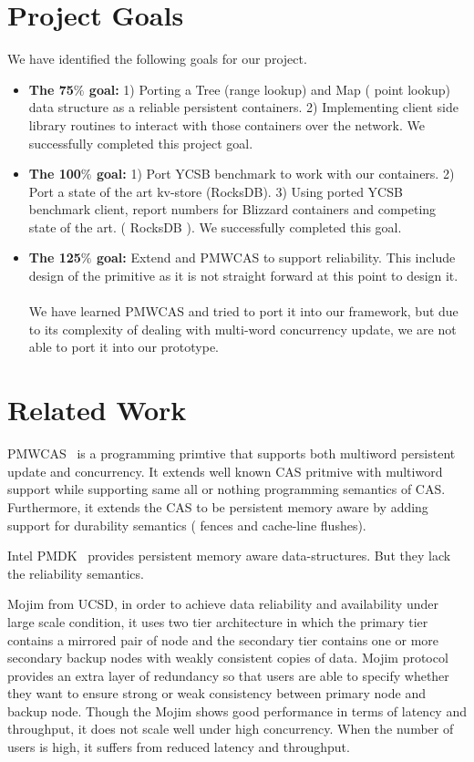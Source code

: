 \section{Project Goals}
We have identified the following goals for our project.
\begin{itemize}
    \item {\bf The 75$\%$ goal:} 1) Porting a Tree (range lookup) and Map ( point lookup) data structure as a reliable persistent containers. 2) Implementing client side library routines to interact with those containers over the network. We successfully completed
				this project goal.
    \item {\bf The 100$\%$ goal:} 1) Port YCSB benchmark to work with our containers. 
				2) Port a state of the art kv-store (RocksDB). 3) Using ported YCSB benchmark client, report numbers 
				for Blizzard containers and competing state of the art. ( RocksDB ). We successfully completed this goal.
    \\
    \item {\bf The 125$\%$ goal:} Extend and PMWCAS to support reliability. This include design of the primitive as it is not straight forward at this point to design it.
    \\ \\
    We have learned PMWCAS and tried to port it into our framework, but due to its complexity of dealing with multi-word concurrency update, we are not able to port it into our prototype. 
\end{itemize}

\section{Related Work}

PMWCAS~\cite{pmwcas} is a programming primtive that supports both multiword persistent update and concurrency.
It extends well known CAS pritmive with multiword support while supporting same all or nothing
programming semantics of CAS. Furthermore, it extends the CAS to be persistent memory aware by
adding support for durability semantics ( fences and cache-line flushes).

Intel PMDK~\cite{pmdk} provides persistent memory aware data-structures. But they lack the reliability semantics.

Mojim from UCSD, in order to achieve data reliability and availability under large scale condition, it uses two tier architecture in which the primary tier contains a mirrored pair of node and the secondary tier contains one or more secondary backup nodes with weakly consistent copies of data. Mojim protocol provides an extra layer of redundancy so that users are able to specify whether they want to ensure strong or weak consistency between primary node and backup node. Though the Mojim shows good performance in terms of latency and throughput, it does not scale well under high concurrency. When the number of users is high, it suffers from reduced latency and throughput. 

